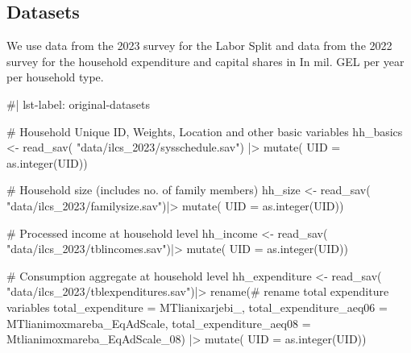 \documentclass[
  letterpaper,
  DIV=11,
  numbers=noendperiod]{scrartcl}
\newenvironment{Shaded}{}{}
\newcommand{\AttributeTok}[1]{\textcolor[rgb]{0.84,0.23,0.29}{#1}}
\newcommand{\CommentTok}[1]{\textcolor[rgb]{0.42,0.45,0.49}{#1}}
\newcommand{\FunctionTok}[1]{\textcolor[rgb]{0.44,0.26,0.76}{#1}}
\newcommand{\NormalTok}[1]{\textcolor[rgb]{0.14,0.16,0.18}{#1}}
\newcommand{\OtherTok}[1]{\textcolor[rgb]{0.44,0.26,0.76}{#1}}
\newcommand{\SpecialCharTok}[1]{\textcolor[rgb]{0.00,0.36,0.77}{#1}}
\newcommand{\StringTok}[1]{\textcolor[rgb]{0.01,0.18,0.38}{#1}}
\begin{document}
\subsection{Datasets}\label{datasets}

We use data from the 2023 survey for the Labor Split and data from the
2022 survey for the household expenditure and capital shares in In mil.
GEL per year per household type.

\begin{Shaded}
\begin{Highlighting}[]
 \CommentTok{\#| lst{-}label: original{-}datasets}

\CommentTok{\# Household Unique ID, Weights, Location and other basic variables}
\NormalTok{hh\_basics }\OtherTok{\textless{}{-}} \FunctionTok{read\_sav}\NormalTok{(}
  \StringTok{"data/ilcs\_2023/sysschedule.sav"}\NormalTok{) }\SpecialCharTok{|\textgreater{}}
  \FunctionTok{mutate}\NormalTok{(}
    \AttributeTok{UID =} \FunctionTok{as.integer}\NormalTok{(UID))}

\CommentTok{\# Household size (includes no. of family members)}
\NormalTok{hh\_size }\OtherTok{\textless{}{-}} \FunctionTok{read\_sav}\NormalTok{(}
  \StringTok{"data/ilcs\_2023/familysize.sav"}\NormalTok{)}\SpecialCharTok{|\textgreater{}} 
  \FunctionTok{mutate}\NormalTok{(}
    \AttributeTok{UID =} \FunctionTok{as.integer}\NormalTok{(UID))}

\CommentTok{\# Processed income at household level}
\NormalTok{hh\_income }\OtherTok{\textless{}{-}} \FunctionTok{read\_sav}\NormalTok{(}
  \StringTok{"data/ilcs\_2023/tblincomes.sav"}\NormalTok{)}\SpecialCharTok{|\textgreater{}} 
  \FunctionTok{mutate}\NormalTok{(}
    \AttributeTok{UID =} \FunctionTok{as.integer}\NormalTok{(UID))}

\CommentTok{\# Consumption aggregate at household level }
\NormalTok{hh\_expenditure }\OtherTok{\textless{}{-}} \FunctionTok{read\_sav}\NormalTok{(}
  \StringTok{"data/ilcs\_2023/tblexpenditures.sav"}\NormalTok{)}\SpecialCharTok{|\textgreater{}} 
  \FunctionTok{rename}\NormalTok{(}\CommentTok{\# rename total expenditure variables}
         \AttributeTok{total\_expenditure =}\NormalTok{ MTlianixarjebi\_,}
         \AttributeTok{total\_expenditure\_aeq06 =}\NormalTok{ MTlianimoxmareba\_EqAdScale,}
         \AttributeTok{total\_expenditure\_aeq08 =}\NormalTok{ Mtlianimoxmareba\_EqAdScale\_08) }\SpecialCharTok{|\textgreater{}} 
  \FunctionTok{mutate}\NormalTok{(}
    \AttributeTok{UID =} \FunctionTok{as.integer}\NormalTok{(UID))}


\end{Highlighting}
\end{Shaded}
\end{document}
